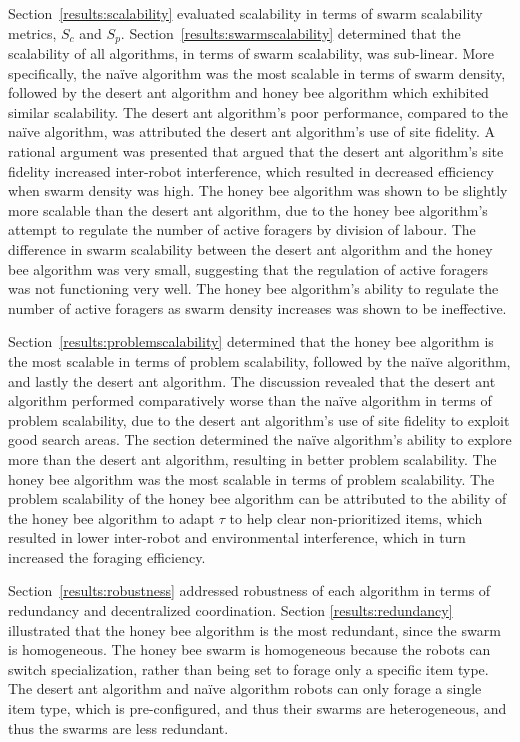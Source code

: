 Section~\ref{results:scalability} evaluated scalability in terms of swarm scalability metrics, $S_c$ and $S_p$. Section~\ref{results:swarmscalability} determined that the scalability of all algorithms, in terms of swarm scalability, was sub-linear. More specifically, the na\"ive algorithm was the most scalable in terms of swarm density, followed by the desert ant algorithm and honey bee algorithm which exhibited similar scalability. The desert ant algorithm's poor performance, compared to the na\"ive algorithm, was attributed the desert ant algorithm's use of site fidelity. A rational argument was presented that argued that the desert ant algorithm's site fidelity increased inter-robot interference, which resulted in decreased efficiency when swarm density was high. The honey bee algorithm was shown to be slightly more scalable than the desert ant algorithm, due to the honey bee algorithm's attempt to regulate the number of active foragers by division of labour. The difference in swarm scalability between the desert ant algorithm and the honey bee algorithm was very small, suggesting that the regulation of active foragers was not functioning very well. The honey bee algorithm's ability to regulate the number of active foragers as swarm density increases was shown to be ineffective. 

Section~\ref{results:problemscalability} determined that the honey bee algorithm is the most scalable in terms of problem scalability, followed by the na\"ive algorithm, and lastly the desert ant algorithm. The discussion revealed that the desert ant algorithm performed comparatively worse than the na\"ive algorithm in terms of problem scalability, due to the desert ant algorithm's use of site fidelity to exploit good search areas. The section determined the na\"ive algorithm's ability to explore more than the desert ant algorithm, resulting in better problem scalability. The honey bee algorithm was the most scalable in terms of problem scalability. The problem scalability of the honey bee algorithm can be attributed to the ability of the honey bee algorithm to adapt $\tau$ to help clear non-prioritized items, which resulted in lower inter-robot and environmental interference, which in turn increased the foraging efficiency.

Section~\ref{results:robustness} addressed robustness of each algorithm in terms of redundancy and decentralized coordination. Section \ref{results:redundancy} illustrated that the honey bee algorithm is the most redundant, since the swarm is homogeneous. The honey bee swarm is homogeneous because the robots can switch specialization, rather than being set to forage only a specific item type. The desert ant algorithm and na\"ive algorithm robots can only forage a single item type, which is pre-configured, and thus their swarms are heterogeneous, and thus the swarms are less redundant.

